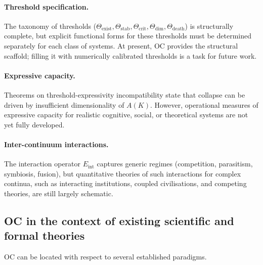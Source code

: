 \paragraph{Threshold specification.}
The taxonomy of thresholds (\(\Theta_{\mathrm{exist}}, \Theta_{\mathrm{stab}}, \Theta_{\mathrm{crit}}, \Theta_{\mathrm{dim}}, \Theta_{\mathrm{death}}\)) is structurally complete, 
but explicit functional forms for these thresholds must be determined separately for each class of systems.
At present, OC provides the structural scaffold; filling it with numerically calibrated thresholds is a task for future work.

\paragraph{Expressive capacity.}
Theorems on threshold-expressivity incompatibility state that collapse can be driven by insufficient dimensionality of \(A(K)\).
However, operational measures of expressive capacity for realistic cognitive,
social, or theoretical systems are not yet fully developed.

\paragraph{Inter-continuum interactions.}
The interaction operator \(E_{\mathrm{int}}\) captures generic regimes (competition, parasitism, symbiosis, fusion), but quantitative theories of such interactions for complex continua, such as interacting institutions, coupled civilisations, and competing theories, are still largely schematic.

\subsection{OC in the context of existing scientific and formal theories}

OC can be located with respect to several established paradigms.

